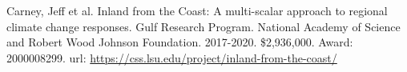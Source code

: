 \documentclass[10pt]{developercv} %
\begin{document}
Carney, Jeff et al. 
Inland from the Coast: A multi-scalar approach to regional climate change responses. 
Gulf Research Program. National Academy of Science and Robert Wood Johnson Foundation.
2017-2020. \$2,936,000. Award: 2000008299.
url: \url{https://css.lsu.edu/project/inland-from-the-coast/}\\


%
%
%
\end{document}
